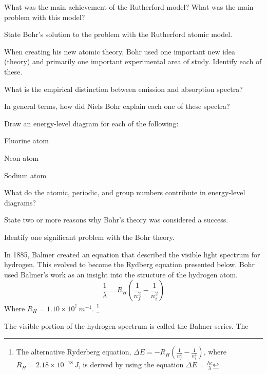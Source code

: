 \begin{problems}
    \item What was the main achievement of the Rutherford model? What was the main problem with
        this model?
    \item State Bohr's solution to the problem with the Rutherford atomic model.
    \item When creating his new atomic theory, Bohr used one important new idea (theory) and
        primarily one important experimental area of study. Identify each of these.
    \item 
        \begin{enum-alph}
            \item What is the empirical distinction between emission and absorption spectra?
            \item In general terms, how did Niels Bohr explain each one of these spectra?
        \end{enum-alph}
    \item Draw an energy-level diagram for each of the following:
        \begin{enum-alph}
            \item Fluorine atom
            \item Neon atom
            \item Sodium atom
        \end{enum-alph}
    \item What do the atomic, periodic, and group numbers contribute in energy-level diagrams?
    \item State two or more reasons why Bohr's theory was considered a success.
    \item Identify one significant problem with the Bohr theory.
    \item In 1885, Balmer created an equation that described the visible light spectrum for
        hydrogen. This evolved to become the Rydberg equation presented below. Bohr used Balmer's
        work as an insight into the structure of the hydrogen atom.
        \[
            \frac{1}{\lambda}=R_H\left(\frac{1}{n_f^2}-\frac{1}{n_i^2}\right)
        \]
        Where $R_H=1.10\times10^7\,\si{m^{-1}}$.
        \footnote {
            The alternative Ryderberg equation, $\Delta E=-R_H\left(\frac{1}{n_f^2}-\frac{1}{n_i^2}\right)$,
            where $R_H=2.18\times10^{-18}\,\si{J}$, is derived by using the equation $\Delta E=\frac{hc}{\lambda}$
        }
        \begin{enum-alph}
            \item The visible portion of the hydrogen spectrum is called the Balmer series. The

\end{enum-alph}
\end{problems}
